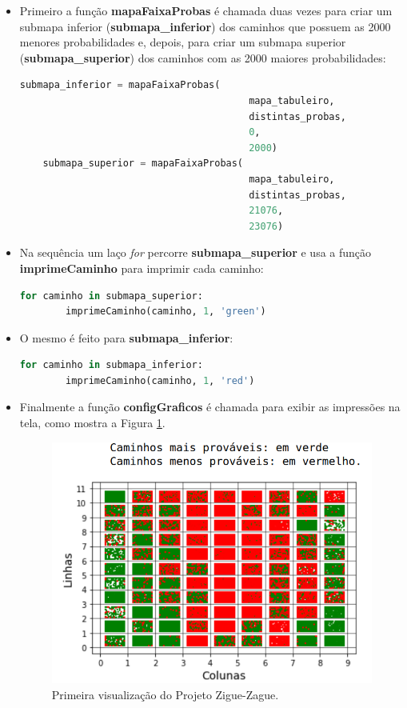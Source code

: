 \documentclass[12pt]{article}
\begin{document}
\begin{itemize}
	\item Primeiro a função \textbf{mapaFaixaProbas} é chamada duas vezes para criar um submapa inferior (\textbf{submapa\_inferior}) dos caminhos que possuem as 2000 menores probabilidades e, depois, para criar um submapa superior (\textbf{submapa\_superior}) dos caminhos com as 2000 maiores probabilidades:
	
	\begin{lstlisting}[language=Python]
	submapa_inferior = mapaFaixaProbas(
										mapa_tabuleiro, 
										distintas_probas, 
										0, 
										2000)
	submapa_superior = mapaFaixaProbas(
										mapa_tabuleiro, 
										distintas_probas, 
										21076, 
										23076)
	\end{lstlisting}
	\item Na sequência um laço \textit{for} percorre \textbf{submapa\_superior} e usa a função \textbf{imprimeCaminho} para imprimir cada caminho:
	\begin{lstlisting}[language=Python]
	for caminho in submapa_superior:
		imprimeCaminho(caminho, 1, 'green')
	\end{lstlisting} 
	\item O mesmo é feito para \textbf{submapa\_inferior}:
	\begin{lstlisting}[language=Python]
	for caminho in submapa_inferior:
		imprimeCaminho(caminho, 1, 'red')
	\end{lstlisting}
	\item Finalmente a função \textbf{configGraficos} é chamada para exibir as impressões na tela, como mostra a Figura \ref{primeira_visualizacao}.
	
	\begin{figure}[ht!]
		\centering
		\includegraphics[width=0.7\linewidth]{img/primeira_visualizacao.png}
		\caption{Primeira visualização do Projeto Zigue-Zague.}	
		\label{primeira_visualizacao}
	\end{figure}
\end{itemize}
\end{document}
